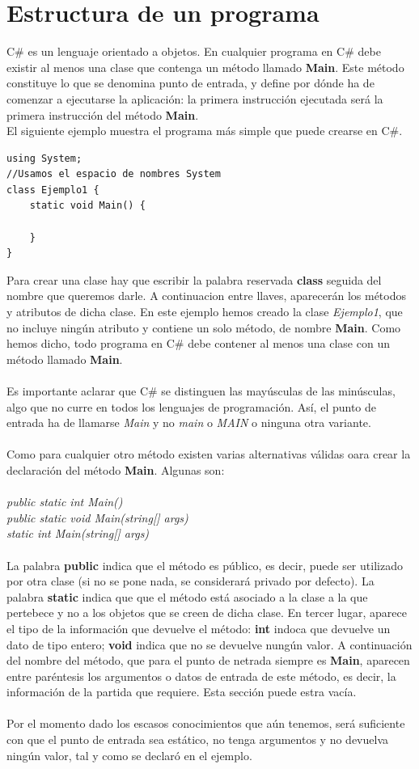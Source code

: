 \documentclass[12pt,a4paper]{report}
\begin{document}
\section{Estructura de un programa}
C\# es un lenguaje orientado a objetos. En cualquier programa en C\# debe existir al menos una clase que contenga un método llamado \textbf{Main}. Este método constituye lo que se denomina punto de entrada, y define por dónde ha de comenzar a ejecutarse la aplicación: la primera instrucción ejecutada será la primera instrucción del método \textbf{Main}.\\El siguiente ejemplo muestra el programa más simple que puede crearse en C\#.
\begin{lstlisting}
using System;
//Usamos el espacio de nombres System
class Ejemplo1 {
	static void Main() {
	
	}
}
\end{lstlisting}
Para crear una clase hay que escribir la palabra reservada \textbf{class} seguida del nombre que queremos darle. A continuacion entre llaves, aparecerán los métodos y atributos de dicha clase. En este ejemplo hemos creado la clase \textit{Ejemplo1}, que no incluye ningún atributo y contiene un solo método, de nombre \textbf{Main}. Como hemos dicho, todo programa en C\# debe contener al menos una clase con un método llamado \textbf{Main}.\\\\Es importante aclarar que C\# se distinguen las mayúsculas de las minúsculas, algo que no curre en todos los lenguajes de programación. Así, el punto de entrada ha de llamarse \textit{Main} y no \textit{main} o \textit{MAIN} o ninguna otra variante.\\\\Como para cualquier otro método existen varias alternativas válidas oara crear la declaración del método \textbf{Main}. Algunas son: \\\\\textit{public static int Main()\\public static void Main(string[] args)\\static int Main(string[] args)}\\\\La palabra \textbf{public} indica que el método es público, es decir, puede ser utilizado por otra clase (si no se pone nada, se considerará privado por defecto). La palabra \textbf{static} indica que que el método está asociado a la clase a la que pertebece y no a los objetos que se creen de dicha clase. En tercer lugar, aparece el tipo de la información que devuelve el método: \textbf{int} indoca que devuelve un dato de tipo entero; \textbf{void}  indica que no se devuelve nungún valor. A continuación del nombre del método, que para el punto de netrada siempre es \textbf{Main}, aparecen entre paréntesis los argumentos o datos de entrada de este método, es decir, la información de la partida que requiere. Esta sección puede estra vacía.\\\\Por el momento dado los escasos conocimientos que aún tenemos, será suficiente con que el punto de entrada sea estático, no tenga argumentos y no devuelva ningún valor, tal y como se declaró en el ejemplo.
\end{document}
